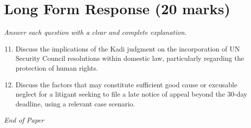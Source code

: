 \documentclass[12pt]{article}
\begin{document}
\section*{Long Form Response (20 marks)}
\textit{Answer each question with a clear and complete explanation.}
\begin{enumerate}[label=\arabic*.]
\setcounter{enumi}{10}
\item Discuss the implications of the Kadi judgment on the incorporation of UN Security Council resolutions within domestic law, particularly regarding the protection of human rights.
\item Discuss the factors that may constitute sufficient good cause or excusable neglect for a litigant seeking to file a late notice of appeal beyond the 30-day deadline, using a relevant case scenario.
\end{enumerate}

\vfill
\noindent\textit{End of Paper}
\end{document}

